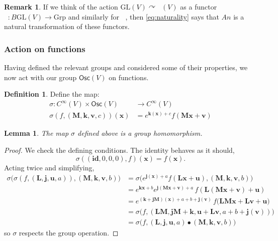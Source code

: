 \documentclass[12pt]{article}
\newcounter{counter}
\theoremstyle{definition}
\newtheorem{dfn}[counter]{Definition}
\newtheorem{rmk}[counter]{Remark}
\theoremstyle{plain}
\newtheorem{lem}[counter]{Lemma}
\newcommand{\Sym}{\mathop{\mathrm{Sym}_2}}
\newcommand{\ActSym}
{\mathop{\mathrm{Act}_{\mathrm{Sym}}}}
\newcommand{\ActSec}
{\mathop{\mathrm{Act}_{\mathrm{Sec}}}}
\begin{document}
\begin{rmk}
    If we think of the action $\mathrm{GL}(V)\curvearrowright \Sym(V)$ as a functor $\ActSym :B\mathrm{GL}(V) \to \mathrm{Grp}$ and similarly for $\ActSec$, then \autoref{eq:naturality} says that $An$ is a natural transformation of these functors.
\end{rmk}

\subsubsection{Action on functions}

Having defined the relevant groups and considered some of their properties, we now act with our group $\mathsf{Osc}(V)$ on functions.\\

\begin{dfn}
    Define the map:
    \begin{align}
        \sigma \colon C^{\infty}(V) \times \mathsf{Osc}(V) &\to C^{\infty}(V) \\
        \sigma (f, (\mathbf{M}, \mathbf{k},  \mathbf{v},  c)) (\mathbf{x})
        &= e^{\mathbf{k} (\mathbf{x}) + c} f(\mathbf{M} \mathbf{x} + \mathbf{v})
    \end{align}
\end{dfn}

\begin{lem}
    The map \(\sigma\) defined above is a group homomorphism.
\end{lem}

\begin{proof}
    We check the defining conditions.  The identity behaves as it should, 
    \begin{equation}
        \sigma ((\mathbf{id}, 0, 0, 0), f)(\mathbf{x}) = f(\mathbf{x}).
    \end{equation}
    Acting twice and simplifying,
    \begin{align}
        \sigma \big( \sigma(f, (\mathbf{L}, \mathbf{j}, \mathbf{u}, a)),
        (\mathbf{M}, \mathbf{k}, \mathbf{v}, b) \big) 
        &= \sigma \big( e^{\mathbf{j} (\mathbf{x}) + a} f(\mathbf{L} \mathbf{x} + \mathbf{u}), (\mathbf{M}, \mathbf{k}, \mathbf{v}, b) \big) \\
        &= e^{\mathbf{k} \mathbf{x} + b} e^{\mathbf{j} (\mathbf{M} \mathbf{x} + \mathbf{v}) + a} \, f(\mathbf{L} (\mathbf{M} \mathbf{x} + \mathbf{v}) + \mathbf{u}) \\
        &= e^{(\mathbf{k} + \mathbf{jM})(\mathbf{x}) + a + b + \mathbf{j} (\mathbf{v})} \, f \big( \mathbf{LM} \mathbf{x} + \mathbf{L} \mathbf{v} + \mathbf{u} \big) \\
        &= \sigma \big( f, (\mathbf{LM}, \mathbf{jM} + \mathbf{k}, \mathbf{u} + \mathbf{L} \mathbf{v}, a + b + \mathbf{j} (\mathbf{v})) \big) \\
        &= \sigma \big( f,(\mathbf{L}, \mathbf{j}, \mathbf{u}, a) 
        \bullet (\mathbf{M}, \mathbf{k}, \mathbf{v}, b))
    \end{align}
    so \(\sigma\) respects the group operation.
\end{proof}
\end{document}
